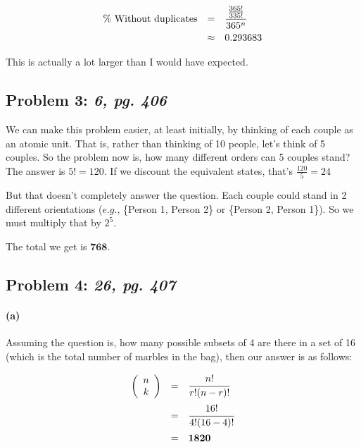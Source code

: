 \documentclass[a4paper]{article}
\begin{document}
\begin{equation}
\begin{array}{rll}
\mbox{\% Without duplicates} & = & \cfrac{\frac{365!}{335!}}{365^n} \\[.1in]
& \approx & 0.293683\\
\end{array}
\end{equation}

This is actually a lot larger than I would have expected.

\subsection*{Problem 3: \textit{6, pg. 406}} We can make this problem easier, at least initially, by thinking of each couple as an atomic unit. That is, rather than thinking of 10 people, let's think of 5 couples. So the problem now is, how many different orders can 5 couples stand? The answer is $5! = 120$. If we discount the equivalent states, that's $\frac{120}{5} = 24$

But that doesn't completely answer the question. Each couple could stand in 2 different orientations ($\textit{e.g.}$, \{Person 1, Person 2\} or \{Person 2, Person 1\}). So we must multiply that by $2^5$.

The total we get is $\textbf{768}$.

\subsection*{Problem 4: \textit{26, pg. 407}}

\paragraph{(a)} Assuming the question is, how many possible subsets of 4 are there in a set of 16 (which is the total number of marbles in the bag), then our answer is as follows:

\begin{equation}
\begin{array}{rll}
\left ( \begin{array}{c} n \\ k \end{array} \right ) & = & \cfrac{n!}{r!(n-r)!} \\[.15in]
& = & \cfrac{16!}{4!(16-4)!} \\[.15in]
& = & \mathbf{1820} \\[.15in]
\end{array}
\end{equation}
\end{document}
